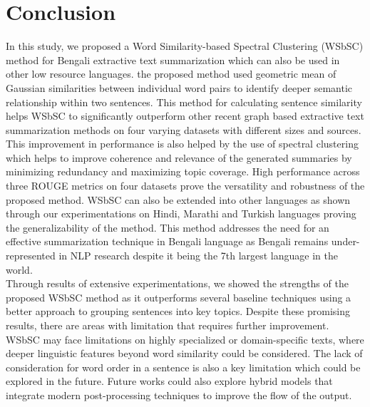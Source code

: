 \documentclass[acmlarge]{acmart}
\begin{document}
\section{Conclusion}\label{sec:conclusion}
In this study, we proposed a Word Similarity-based Spectral Clustering (WSbSC) method for Bengali extractive text summarization which can also be used in other low resource languages. the proposed method used geometric mean of Gaussian similarities between individual word pairs to identify deeper semantic relationship within two sentences. This method for calculating sentence similarity helps WSbSC to significantly outperform other recent graph based extractive text summarization methods on four varying datasets with different sizes and sources. This improvement in performance is also helped by the use of spectral clustering which helps to improve coherence and relevance of the generated summaries by minimizing redundancy and maximizing topic coverage. High performance across three ROUGE metrics on four datasets prove the versatility and robustness of the proposed method. WSbSC can also be extended into other languages as shown through our experimentations on Hindi, Marathi and Turkish languages proving the generalizability of the method. This method addresses the need for an effective summarization technique in Bengali language as Bengali remains under-represented in NLP research despite it being the 7th largest language in the world.\\

Through results of extensive experimentations, we showed the strengths of the proposed WSbSC method as it outperforms several baseline techniques using a better approach to grouping sentences into key topics. Despite these promising results, there are areas with limitation that requires further improvement. WSbSC may face limitations on highly specialized or domain-specific texts, where deeper linguistic features beyond word similarity could be considered. The lack of consideration for word order in a sentence is also a key limitation which could be explored in the future. Future works could also explore hybrid models that integrate modern post-processing techniques to improve the flow of the output.\\
\end{document}
